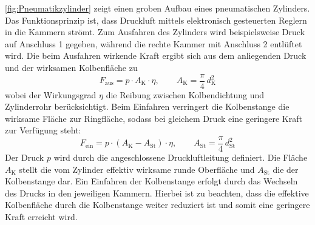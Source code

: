 \cref{fig:Pneumatikzylinder} zeigt einen groben Aufbau eines pneumatischen Zylinders. Das Funktionsprinzip
ist, dass Druckluft mittels elektronisch gesteuerten Reglern in die Kammern strömt. Zum Ausfahren
des Zylinders wird beispielsweise Druck auf Anschluss 1 gegeben, während die rechte Kammer mit Anschluss 2 entlüftet wird.
Die beim Ausfahren wirkende Kraft ergibt sich aus dem anliegenden Druck und der wirksamen Kolbenfläche zu
\begin{equation}
  F_\mathrm{aus} = p \cdot A_\mathrm{K} \cdot \eta ,
  \qquad A_\mathrm{K} = \frac{\pi}{4} \, d_\mathrm{K}^{2}
  \label{eq:pneumatik_ausfahren}
\end{equation}
wobei der Wirkungsgrad $\eta$ die Reibung zwischen Kolbendichtung und Zylinderrohr
berücksichtigt. Beim Einfahren verringert die Kolbenstange die wirksame Fläche zur
Ringfläche, sodass bei gleichem Druck eine geringere Kraft zur Verfügung steht:
\begin{equation}
  F_\mathrm{ein} = p \cdot \left( A_\mathrm{K} - A_\mathrm{St} \right) \cdot \eta ,
  \qquad A_\mathrm{St} = \frac{\pi}{4} \, d_\mathrm{St}^{2}
  \label{eq:pneumatik_einfahren}
\end{equation}
Der Druck $p$ wird durch die angeschlossene Druckluftleitung definiert. Die Fläche $A_\mathrm{K}$ stellt die vom
Zylinder effektiv wirksame runde Oberfläche und $A_\mathrm{St}$ die der Kolbenstange dar. Ein Einfahren der Kolbenstange erfolgt durch das Wechseln des Drucks in den jeweiligen Kammern.
Hierbei ist zu beachten, dass die effektive Kolbenfläche durch die Kolbenstange weiter reduziert ist und somit eine geringere
Kraft erreicht wird.

